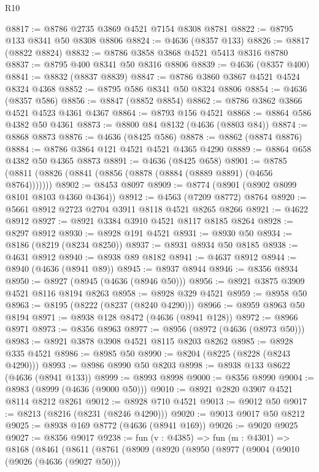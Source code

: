 \begin{lexlean}{R10}
\begin{coremodule}
@8817 := @8786 @2735 @3869 @4521 @7154 @8308 @8781
@8822 := @8795 @133 @8341 @50 @8308 @8806
@8824 := @4636 (@8357 @133)
@8826 := @8817 (@8822 @8824)
@8832 := @8786 @3858 @3868 @4521 @5413 @8316 @8780
@8837 := @8795 @400 @8341 @50 @8316 @8806
@8839 := @4636 (@8357 @400)
@8841 := @8832 (@8837 @8839)
@8847 := @8786 @3860 @3867 @4521 @4524 @8324 @4368
@8852 := @8795 @586 @8341 @50 @8324 @8806
@8854 := @4636 (@8357 @586)
@8856 := @8847 (@8852 @8854)
@8862 := @8786 @3862 @3866 @4521 @4523 @4361 @4367
@8864 := @8793 @156 @4521
@8868 := @8864 @586 @4382 @50 @4361
@8873 := @8800 @84 @8132 (@4636 (@8803 @84))
@8874 := @8868 @8873
@8876 := @4636 (@8425 @586)
@8878 := @8862 (@8874 @8876)
@8884 := @8786 @3864 @121 @4521 @4521 @4365 @4290
@8889 := @8864 @658 @4382 @50 @4365 @8873
@8891 := @4636 (@8425 @658)
@8901 := @8785 (@8811 (@8826 (@8841 (@8856 (@8878 (@8884 (@8889 @8891) (@4656 @8764)))))))
@8902 := @8453 @8097
@8909 := @8774 (@8901 (@8902 @8099 @8101 @8103 @4360 @4364))
@8912 := @4563 (@7209 @8772) @8764
@8920 := @5661 @8912 @2723 @2704 @3911 @8118 @4521 @8265 @8266
@8921 := @4622 @8912
@8927 := @8921 @3384 @3910 @4521 @8117 @8185 @8264
@8928 := @8297 @8912
@8930 := @8928 @191 @4521
@8931 := @8930 @50
@8934 := @8186 (@8219 (@8234 @8250))
@8937 := @8931 @8934 @50 @8185
@8938 := @4631 @8912
@8940 := @8938 @89 @8182
@8941 := @4637 @8912
@8944 := @8940 (@4636 (@8941 @89))
@8945 := @8937 @8944
@8946 := @8356 @8934
@8950 := @8927 (@8945 (@4636 (@8946 @50)))
@8956 := @8921 @3875 @3909 @4521 @8116 @8194 @8263
@8958 := @8928 @329 @4521
@8959 := @8958 @50
@8963 := @8195 (@8222 (@8237 (@8240 @4290)))
@8966 := @8959 @8963 @50 @8194
@8971 := @8938 @128 @8472 (@4636 (@8941 @128))
@8972 := @8966 @8971
@8973 := @8356 @8963
@8977 := @8956 (@8972 (@4636 (@8973 @50)))
@8983 := @8921 @3878 @3908 @4521 @8115 @8203 @8262
@8985 := @8928 @335 @4521
@8986 := @8985 @50
@8990 := @8204 (@8225 (@8228 (@8243 @4290)))
@8993 := @8986 @8990 @50 @8203
@8998 := @8938 @133 @8622 (@4636 (@8941 @133))
@8999 := @8993 @8998
@9000 := @8356 @8990
@9004 := @8983 (@8999 (@4636 (@9000 @50)))
@9010 := @8921 @2820 @3907 @4521 @8114 @8212 @8261
@9012 := @8928 @710 @4521
@9013 := @9012 @50
@9017 := @8213 (@8216 (@8231 (@8246 @4290)))
@9020 := @9013 @9017 @50 @8212
@9025 := @8938 @169 @8772 (@4636 (@8941 @169))
@9026 := @9020 @9025
@9027 := @8356 @9017
@9238 := fun (v : @4385) =>
  fun (m : @4301) =>
  @8168
    (@8461
      (@8611
        (@8761
          (@8909
            (@8920
              (@8950
                (@8977
                  (@9004
                    (@9010
                      (@9026 (@4636 (@9027 @50)))

\end{coremodule}
\end{lexlean}
